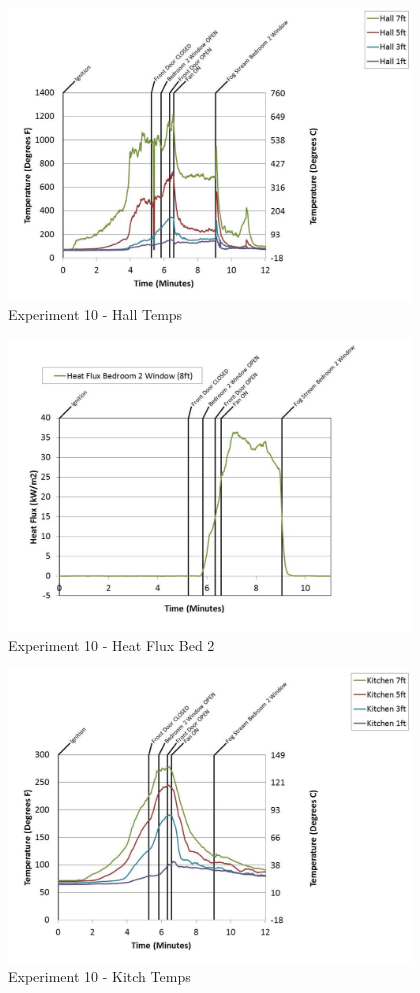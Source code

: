 \documentclass{article}
\begin{document}
\begin{appendices}
	\clearpage

	\begin{figure}[h!]
		\centering
		\includegraphics[height=3.05in]{0_Images/Results_Charts/Exp_10_Charts/HallTemps.pdf}
		\caption{Experiment 10 - Hall Temps}
	\end{figure}
 

	\begin{figure}[h!]
		\centering
		\includegraphics[height=3.05in]{0_Images/Results_Charts/Exp_10_Charts/HeatFluxBed2.pdf}
		\caption{Experiment 10 - Heat Flux Bed 2}
	\end{figure}
 
	\clearpage

	\begin{figure}[h!]
		\centering
		\includegraphics[height=3.05in]{0_Images/Results_Charts/Exp_10_Charts/KitchTemps.pdf}
		\caption{Experiment 10 - Kitch Temps}
	\end{figure}
 


\end{appendices}
\end{document}
